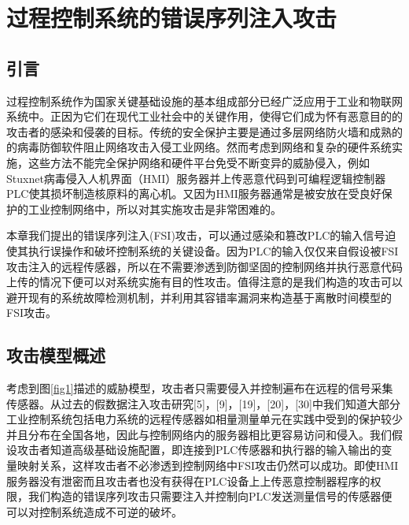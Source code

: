 
\chapter{过程控制系统的错误序列注入攻击}
\label{chap:FSIattack}

\section{引言}
\label{sec:intro}

过程控制系统作为国家关键基础设施的基本组成部分已经广泛应用于工业和物联网系统中。正因为它们在现代工业社会中的关键作用，使得它们成为怀有恶意目的的攻击者的感染和侵袭的目标。传统的安全保护主要是通过多层网络防火墙和成熟的的病毒防御软件阻止网络攻击入侵工业网络。然而考虑到网络和复杂的硬件系统实施，这些方法不能完全保护网络和硬件平台免受不断变异的威胁侵入，例如Stuxnet病毒侵入人机界面（HMI）服务器并上传恶意代码到可编程逻辑控制器PLC使其损坏制造核原料的离心机。又因为HMI服务器通常是被安放在受良好保护的工业控制网络中，所以对其实施攻击是非常困难的。

本章我们提出的错误序列注入(FSI)攻击，可以通过感染和篡改PLC的输入信号迫使其执行误操作和破坏控制系统的关键设备。因为PLC的输入仅仅来自假设被FSI攻击注入的远程传感器，所以在不需要渗透到防御坚固的控制网络并执行恶意代码上传的情况下便可以对系统实施有目的性攻击。值得注意的是我们构造的攻击可以避开现有的系统故障检测机制，并利用其容错率漏洞来构造基于离散时间模型的FSI攻击。

\section{攻击模型概述}
\label{sec:formulation}

考虑到图\ref{fig1}描述的威胁模型，攻击者只需要侵入并控制遍布在远程的信号采集传感器。从过去的假数据注入攻击研究[5]，[9]，[19]，[20]，[30]中我们知道大部分工业控制系统包括电力系统的远程传感器如相量测量单元在实践中受到的保护较少并且分布在全国各地，因此与控制网络内的服务器相比更容易访问和侵入。我们假设攻击者知道高级基础设施配置，即连接到PLC传感器和执行器的输入输出的变量映射关系，这样攻击者不必渗透到控制网络中FSI攻击仍然可以成功。即使HMI服务器没有泄密而且攻击者也没有获得在PLC设备上上传恶意控制器程序的权限，我们构造的错误序列攻击只需要注入并控制向PLC发送测量信号的传感器便可以对控制系统造成不可逆的破坏。

